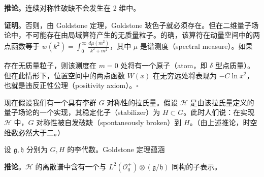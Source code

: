 
\noindent\textbf{推论}。连续对称性破缺不会发生在 2 维中。

\noindent\textbf{证明}。否则，由 Goldstone 定理，Goldstone 玻色子就必须存在。但在二维量子场论中，不可能存在由局域算符产生的无质量粒子。的确，该算符在动量空间中的两点函数等于 $w(k^2)=\int_0^\infty\frac{d\mu(m^2)}{k^2+m^2}$，其中 $\mu$ 是谱测度（spectral measure）。如果

存在无质量粒子，则该测度在 $m=0$ 处将有一个原子（atom，即 $\delta$ 型点质量）。但在此情形下，位置空间中的两点函数 $W(x)$ 在无穷远处将表现为 $-C\ln x^2$，也就是违反正性公理（positivity axiom）。$\square$


现在假设我们有一个具有李群 $G$ 对称性的拉氏量。假设 $\mathcal{H}$ 是由该拉氏量定义的量子场论的一个实现，其稳定化子（stabilizer）为 $H\subset G$。此时人们说：在实现 $\mathcal{H}$ 中，$G$ 对称性被自发破缺（spontaneously broken）到 $H$。（由上述推论，时空维数必然大于二。）

设 $\mathfrak{g},\mathfrak{h}$ 分别为 $G,H$ 的李代数。Goldstone 定理蕴涵

\noindent\textbf{推论}。$\mathcal{H}$ 的离散谱中含有一个与 $L^2(\mathcal{O}_0^+)\otimes(\mathfrak{g}/\mathfrak{h})$ 同构的子表示。

